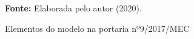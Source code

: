 \begin{figure}[ht!]
\centering

\caption{\textmd{Elementos do modelo na portaria nº9/2017/MEC}}
\label{fig:art10}

\par\medskip\textbf{Fonte:} Elaborada pelo autor (2020). \par\medskip

\end{figure}

